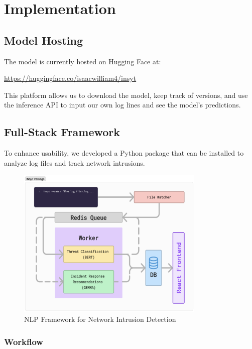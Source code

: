 \documentclass[12pt]{article}
\begin{document}
\section{Implementation}

\subsection{Model Hosting}

The model is currently hosted on Hugging Face at:

\begin{center}
    \url{https://huggingface.co/isaacwilliam4/insyt}
\end{center}

This platform allows us to download the model, keep track of versions, and use the inference API to input our own log lines and see the model's predictions.

\subsection{Full-Stack Framework}

To enhance usability, we developed a Python package that can be installed to analyze log files and track network intrusions.

\begin{figure}[htbp]
    \centering
    \includegraphics[width=0.8\textwidth]{insyt_package.png}
    \caption{NLP Framework for Network Intrusion Detection}
    \label{fig:insyt_package}
\end{figure}

\subsubsection{Workflow}
\end{document}
